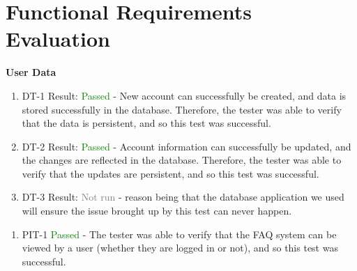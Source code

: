 \documentclass[12pt, titlepage]{article}
\begin{document}
\newpage


\section{Functional Requirements Evaluation}

\large{\textbf{User Data}}

\normalsize

\begin{enumerate}
  \item DT-1
  Result: \textcolor{green}{Passed} - New account can successfully be created, and data is stored successfully in the database. Therefore, the tester was able to verify that the data is 
  persistent, and so this test was successful.
  \item DT-2
  Result: \textcolor{green}{Passed} - Account information can successfully be updated, and the changes are reflected in the database. Therefore, the tester was able to verify
  that the updates are persistent, and so this test was successful.
  \item DT-3
  Result: \textcolor{gray}{Not run} - reason being that the database application we used will ensure the issue brought up by this test can never happen.\\
\end{enumerate}


\normalsize

\begin{enumerate}
  \item PIT-1 \textcolor{green}{Passed} - The tester was able to verify that the FAQ system can be viewed by a user (whether they are logged in or not), and so this test was successful.\\
\end{enumerate}


\normalsize
\end{document}
